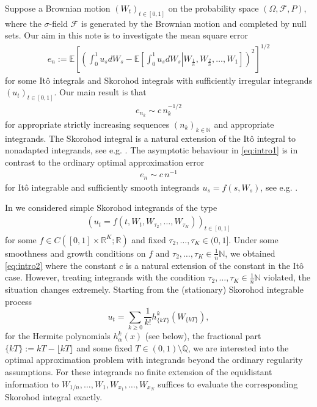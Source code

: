 \documentclass[a4paper,11pt,reqno]{amsart}
\theoremstyle{plain}
\def\N{\mathbb{N}}
\def\Q{\mathbb{Q}}
\def\R{\mathbb{R}}
\def\ex{\mathbb{E}}
\numberwithin{equation}{section}
\begin{document}
Suppose a Brownian motion $(W_{t})_{t \in [0,1]}$ on the probability space $(\Omega, \mathcal{F}, P)$, where the $\sigma$-field $\mathcal{F}$ is generated by the Brownian motion and completed by null sets. Our aim in this note is to investigate the mean square error
\begin{align*}%
e_{n} := \ex\left[\left(\int_{0}^{1} u_s dW_s - \ex\left[\left.\int_{0}^{1} u_s dW_s\right|W_{\frac{1}{n}}, W_{\frac{2}{n}}, \ldots, W_1 \right]\right)^2\right]^{1/2}
\end{align*}
for some It\^o integrals and Skorohod integrals with sufficiently irregular integrands $(u_t)_{t \in [0,1]}$. Our main result is that
\begin{align}\label{eq:intro1}
e_{n_k} \sim c \, n_k^{-1/2} 
\end{align}
for appropriate strictly increasing sequences $(n_k)_{k \in \N}$ and appropriate integrands. The Skorohod integral is a natural extension of the It\^o integral to nonadapted integrands, see e.g. \cite{Nualart, Di_Nunno_und_so}. The asymptotic behaviour in \eqref{eq:intro1} is in contrast to the ordinary optimal approximation error 
\begin{align}\label{eq:intro2}
e_n \sim c \, n^{-1}  
\end{align}
for It\^o integrable and sufficiently smooth integrands $u_s = f(s,W_s)$, see e.g. \cite{Mueller_Gronbach, Przybylowicz, Kloeden_Platen}.


In \cite{NP} we considered simple Skorohod integrands of the type
\begin{align}\label{eq:integrandIntro}
\left(u_{t}= f(t, W_{t}, W_{\tau_2},\ldots, W_{\tau_K})\right)_{t \in [0,1]}  
\end{align}
for some $f \in C([0,1] \times \R^{K}; \R)$ and fixed $\tau_2,\ldots, \tau_K \in (0,1]$. Under some smoothness and growth conditions on $f$ and $\tau_2,\ldots, \tau_K \in \frac{1}{n}\N$, we obtained \eqref{eq:intro2} where the constant $c$ is a natural extension of the constant in the It\^o case. However, treating integrands with the condition $\tau_2,\ldots, \tau_K \in \frac{1}{n}\N$ violated, the situation changes extremely. Starting from the (stationary) Skorohod integrable process
\[
u_t = \sum_{k \geq 0} \frac{1}{k!} h^{k}_{\{kT\}}(W_{\{kT\}}), 
\]
for the Hermite polynomials $h^{k}_{\alpha}(x)$ (see below), the fractional part $\{kT\} := kT - \lfloor kT \rfloor $ and some fixed $T \in (0,1)\setminus \Q$, we are interested into the optimal approximation problem with integrands beyond the ordinary regularity assumptions. For these integrands no finite extension of the equidistant information to $W_{1/n}, \ldots, W_{1}, W_{x_1}, \ldots, W_{x_N}$ suffices to evaluate the corresponding Skorohod integral exactly.
\end{document}
